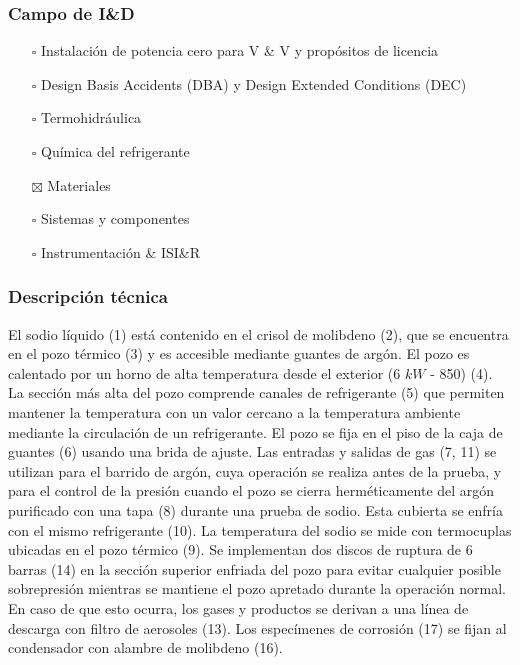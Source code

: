 \documentclass{article}
\begin{document}
\subsubsection*{Campo de I\&D}
\begin{itemize}
\item[$\square$] Instalación de potencia cero para V \& V y propósitos de licencia
\item[$\square$] Design Basis Accidents (DBA) y Design Extended Conditions (DEC)
\item[$\square$] Termohidráulica
\item[$\square$] Química del refrigerante
\item[$\boxtimes$] Materiales
\item[$\square$] Sistemas y componentes
\item[$\square$] Instrumentación \& ISI\&R
\end{itemize}
\subsubsection*{Descripción técnica}
El sodio líquido (1) está contenido en el crisol de molibdeno (2), que se encuentra en el pozo térmico (3) y es accesible mediante guantes de argón. El pozo es calentado por un horno de alta temperatura desde el exterior (6 $kW$ - 850\celsius) (4). La sección más alta del pozo comprende canales de refrigerante (5) que permiten mantener la temperatura con un valor cercano a la temperatura ambiente mediante la circulación de un refrigerante. El pozo se fija en el piso de la caja de guantes (6) usando una brida de ajuste. Las entradas y salidas de gas (7, 11) se utilizan para el barrido de argón, cuya operación se realiza antes de la prueba, y para el control de la presión cuando el pozo se cierra herméticamente del argón purificado con una tapa (8) durante una prueba de sodio. Esta cubierta se enfría con el mismo refrigerante (10). La temperatura del sodio se mide con termocuplas ubicadas en el pozo térmico (9). Se implementan dos discos de ruptura de 6 barras (14) en la sección superior enfriada del pozo para evitar cualquier posible sobrepresión mientras se mantiene el pozo apretado durante la operación normal. En caso de que esto ocurra, los gases y productos se derivan a una línea de descarga con filtro de aerosoles (13). Los especímenes de corrosión (17) se fijan al condensador con alambre de molibdeno (16).
\end{document}
